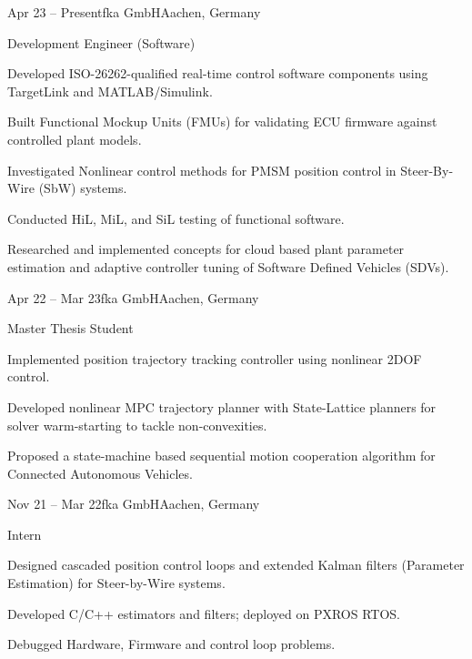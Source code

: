 \documentclass[11pt,a4paper,lang=en]{mycv}
\begin{document}
	\makecvheader
	\begin{profexperience}
		\begin{experienceentry}{Apr 23 -- Present}{fka GmbH}{Aachen, Germany}
			\begin{role}{Development Engineer (Software)}{}
				\item Developed ISO-26262-qualified real-time control software components using TargetLink and MATLAB/Simulink.
				\item Built Functional Mockup Units (FMUs) for validating ECU firmware against controlled plant models.
				\item Investigated Nonlinear control methods for PMSM position control in Steer-By-Wire (SbW) systems.
				\item Conducted HiL, MiL, and SiL testing of functional software.
				\item Researched and implemented concepts for cloud based plant parameter estimation and adaptive controller tuning of Software Defined Vehicles (SDVs).
			\end{role}
		\end{experienceentry}
		\begin{experienceentry}{Apr 22 -- Mar 23}{fka GmbH}{Aachen, Germany}
			\begin{role}{Master Thesis Student}{}
				\item Implemented position trajectory tracking controller using nonlinear 2DOF control.
				\item Developed nonlinear MPC trajectory planner with State-Lattice planners for solver warm-starting to tackle non-convexities.
				\item Proposed a state-machine based sequential motion cooperation algorithm for Connected Autonomous Vehicles.
			\end{role}
		\end{experienceentry}
		\begin{experienceentry}{Nov 21 -- Mar 22}{fka GmbH}{Aachen, Germany}
			\begin{role}{Intern}{}
				\item Designed cascaded position control loops and extended Kalman filters (Parameter Estimation) for Steer-by-Wire systems.
				\item Developed C/C++ estimators and filters; deployed on PXROS RTOS.
				\item Debugged Hardware, Firmware and control loop problems.
			\end{role}
		\end{experienceentry}

\end{profexperience}
\end{document}
